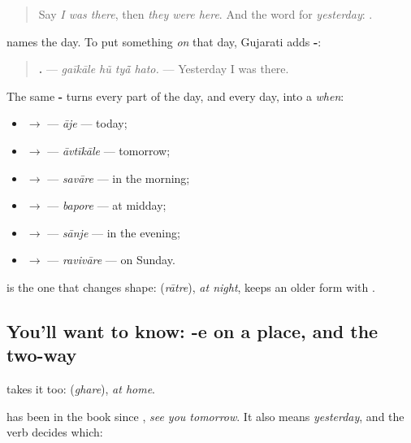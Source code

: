 \label{lesson:GU-C147-gaikale}



\begin{quote}
Say \emph{I was there}, then \emph{they were here}. And the word for \emph{yesterday}: \textbf{}.
\end{quote}

\begin{grammarlens}[title={Grammar Lens: -e on a time}]
\textbf{} names the day. To put something \emph{on} that day, Gujarati adds \textbf{-}:

\begin{quote}
\textbf{   .} — \emph{gaīkāle hũ tyā̃ hato.} — Yesterday I was there.
\end{quote}

The same \textbf{-} turns every part of the day, and every day, into a \emph{when}:

\begin{itemize}
\raggedright
  \item \textbf{} $\to$ \textbf{} — \emph{āje} — today;
  \item \textbf{} $\to$ \textbf{} — \emph{āvtīkāle} — tomorrow;
  \item \textbf{} $\to$ \textbf{} — \emph{savāre} — in the morning;
  \item \textbf{} $\to$ \textbf{} — \emph{bapore} — at midday;
  \item \textbf{} $\to$ \textbf{} — \emph{sānje} — in the evening;
  \item \textbf{} $\to$ \textbf{} — \emph{ravivāre} — on Sunday.
\end{itemize}

\textbf{} is the one that changes shape: \textbf{} (\emph{rātre}), \emph{at night}, keeps an older form with \textbf{}.
\end{grammarlens}

\subsection*{You'll want to know: -e on a place, and the two-way }
\textbf{} takes it too: \textbf{} (\emph{ghare}), \emph{at home}.

\textbf{} has been in the book since \textbf{ }, \emph{see you tomorrow}. It also means \emph{yesterday}, and the verb decides which:

